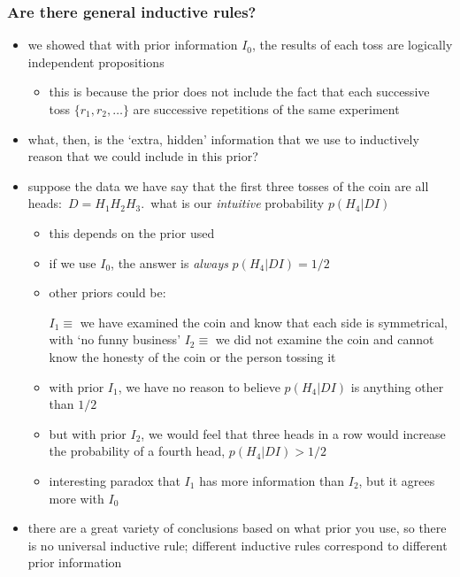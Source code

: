 \documentclass[../jaynes_prob_theory_notes.tex]{subfiles}
\begin{document}
            \subsubsection{Are there general inductive rules?}
                \begin{itemize}
                    \item we showed that with prior information $I_0$, the results of each toss are logically independent propositions
                        \begin{itemize}
                            \item this is because the prior does not include the fact that each successive toss $\{r_1, r_2, \ldots \}$ are successive repetitions of the same experiment
                        \end{itemize}
                    \item what, then, is the `extra, hidden' information that we use to inductively reason that we could include in this prior?
                    \item suppose the data we have say that the first three tosses of the coin are all heads:\ $D = H_1 H_2 H_3$.\ what is our \textit{intuitive} probability $p(H_4 | DI)$
                        \begin{itemize}
                            \item this depends on the prior used
                            \item if we use $I_0$, the answer is \textit{always} $p(H_4 | DI) = 1/2$
                            \item other priors could be:
                                \begin{displayquote}
                                    $I_1 \equiv$ we have examined the coin and know that each side is symmetrical, with `no funny business'
                                    $I_2 \equiv$ we did not examine the coin and cannot know the honesty of the coin or the person tossing it
                                \end{displayquote}
                            \item with prior $I_1$, we have no reason to believe $p(H_4 |DI)$ is anything other than $1/2$
                            \item but with prior $I_2$, we would feel that three heads in a row would increase the probability of a fourth head, $p(H_4 | DI) > 1/2$
                            \item interesting paradox that $I_1$ has more information than $I_2$, but it agrees more with $I_0$
                        \end{itemize}
                    \item there are a great variety of conclusions based on what prior you use, so there is no universal inductive rule; different inductive rules correspond to different prior information
                \end{itemize}
\end{document}
